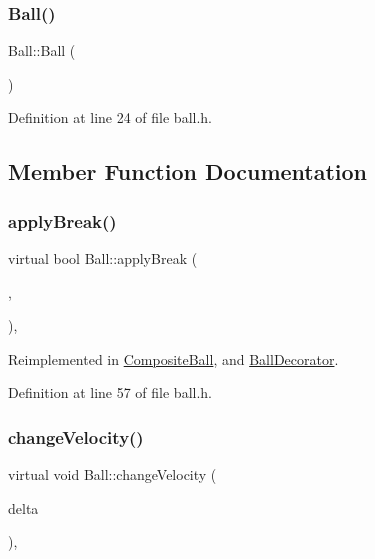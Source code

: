 \subsubsection{\texorpdfstring{Ball()}{Ball()}\hspace{0.1cm}{\footnotesize\ttfamily [2/2]}}
{\footnotesize\ttfamily Ball\+::\+Ball (\begin{DoxyParamCaption}{ }\end{DoxyParamCaption})\hspace{0.3cm}{\ttfamily [inline]}}



Definition at line 24 of file ball.\+h.



\subsection{Member Function Documentation}
\mbox{\label{class_ball_a9df4c9fc8620d003cf9717d84e64d5ee}} 
\subsubsection{\texorpdfstring{apply\+Break()}{applyBreak()}}
{\footnotesize\ttfamily virtual bool Ball\+::apply\+Break (\begin{DoxyParamCaption}\item[{const Q\+Vector2D \&}]{,  }\item[{std\+::vector$<$ \mbox{\hyperlink{class_ball}{Ball}} $\ast$$>$ \&}]{ }\end{DoxyParamCaption})\hspace{0.3cm}{\ttfamily [inline]}, {\ttfamily [virtual]}}



Reimplemented in \mbox{\hyperlink{class_composite_ball_a0da2c5749caafcef943f14a500a0fc9b}{Composite\+Ball}}, and \mbox{\hyperlink{class_ball_decorator_a6c11bb4c2a4accb0167a71c8a5cc5ea7}{Ball\+Decorator}}.



Definition at line 57 of file ball.\+h.

\mbox{\label{class_ball_add51f90f60cb862daa8f3f7aa743f933}} 
\subsubsection{\texorpdfstring{change\+Velocity()}{changeVelocity()}}
{\footnotesize\ttfamily virtual void Ball\+::change\+Velocity (\begin{DoxyParamCaption}\item[{const Q\+Vector2D \&}]{delta }\end{DoxyParamCaption})\hspace{0.3cm}{\ttfamily [inline]}, {\ttfamily [virtual]}}



